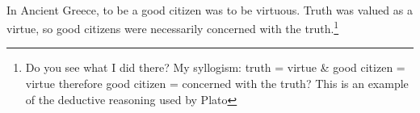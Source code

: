 \paragraph{}In Ancient Greece, to be a good citizen was to be virtuous. Truth was valued as a virtue, so good citizens were necessarily concerned with the truth.\footnote{Do you see what I did there? My syllogism: truth = virtue \& good citizen = virtue therefore good citizen = concerned with the truth? This is an example of the deductive reasoning used by Plato} 
